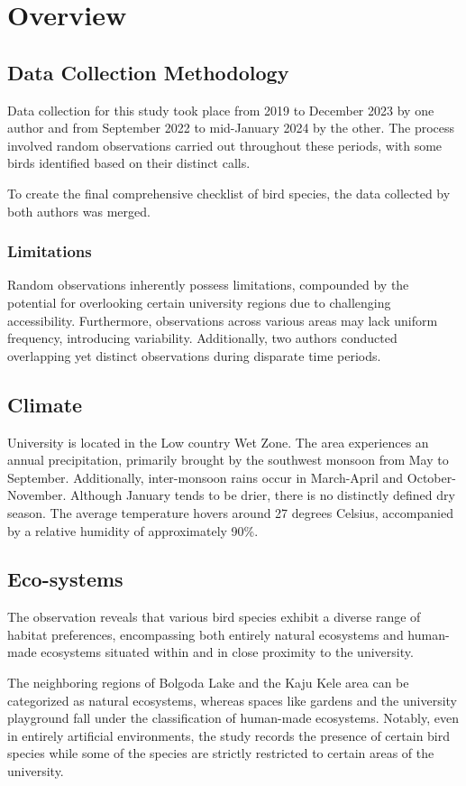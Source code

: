 \chapter{Overview}
\label{cp:overview}
\section{Data Collection Methodology}
Data collection for this study took place from 2019 to December 2023 by one author and from September 2022 to mid-January 2024 by the other. The process involved random observations carried out throughout these periods, with some birds identified based on their distinct calls.

To create the final comprehensive checklist of bird species, the data collected by both authors was merged.

\begin{importantbox}
\subsection{Limitations}
 Random observations inherently possess limitations, compounded by the potential for overlooking certain university regions due to challenging accessibility. Furthermore, observations across various areas may lack uniform frequency, introducing variability. Additionally, two authors conducted overlapping yet distinct observations during disparate time periods.
\end{importantbox}

\section{Climate}
University is located in the Low country Wet Zone. The area experiences an annual precipitation, primarily brought by the southwest monsoon from May to September. Additionally, inter-monsoon rains occur in March-April and October-November. Although January tends to be drier, there is no distinctly defined dry season. The average temperature hovers around 27 degrees Celsius, accompanied by a relative humidity of approximately 90\%.

\section{Eco-systems}
The observation reveals that various bird species exhibit a diverse range of habitat preferences, encompassing both entirely natural ecosystems and human-made ecosystems situated within and in close proximity to the university.

The neighboring regions of Bolgoda Lake and the Kaju Kele area can be categorized as natural ecosystems, whereas spaces like gardens and the university playground fall under the classification of human-made ecosystems. Notably, even in entirely artificial environments, the study records the presence of certain bird species while some of the species are strictly restricted to certain areas of the university.
